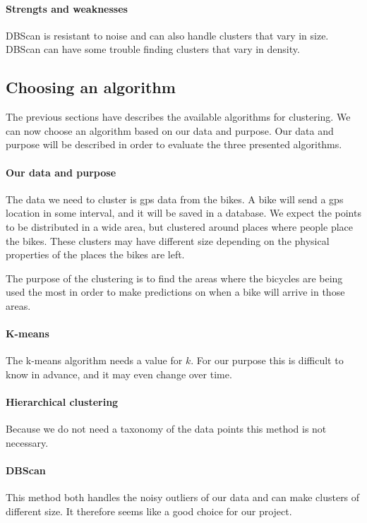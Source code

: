 \paragraph{Strengts and weaknesses}
DBScan is resistant to noise and can also handle clusters that vary in size.
DBScan can have some trouble finding clusters that vary in density.

\subsection{Choosing an algorithm}
The previous sections have describes the available algorithms for clustering.
We can now choose an algorithm based on our data and purpose.
Our data and purpose will be described in order to evaluate the three presented algorithms.

\paragraph{Our data and purpose}
The data we need to cluster is gps data from the bikes.
A bike will send a gps location in some interval, and it will be saved in a database.
We expect the points to be distributed in a wide area, but clustered around places where people place the bikes.
These clusters may have different size depending on the physical properties of the places the bikes are left.

The purpose of the clustering is to find the areas where the bicycles are being used the most in order to make predictions on when a bike will arrive in those areas.

\paragraph{K-means}
The k-means algorithm needs a value for $ k $.
For our purpose this is difficult to know in advance, and it may even change over time.

\paragraph{Hierarchical clustering}
Because we do not need a taxonomy of the data points this method is not necessary.

\paragraph{DBScan}
This method both handles the noisy outliers of our data and can make clusters of different size.
It therefore seems like a good choice for our project.


